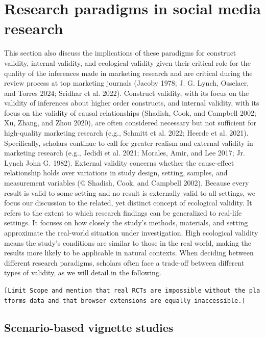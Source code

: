 \documentclass[
  a4paper,
]{scrreprt}
\begin{document}
\hypertarget{research-paradigms-in-social-media-research}{%
\section{Research paradigms in social media
research}\label{research-paradigms-in-social-media-research}}

This section also discuss the implications of these paradigms for
construct validity, internal validity, and ecological validity given
their critical role for the quality of the inferences made in marketing
research and are critical during the review process at top marketing
journals (Jacoby 1978; J. G. Lynch, Osselaer, and Torres 2024; Sridhar
et al. 2022). Construct validity, with its focus on the validity of
inferences about higher order constructs, and internal validity, with
its focus on the validity of causal relationships (Shadish, Cook, and
Campbell 2002; Xu, Zhang, and Zhou 2020), are often considered necessary
but not sufficient for high-quality marketing research (e.g., Schmitt et
al. 2022; Heerde et al. 2021). Specifically, scholars continue to call
for greater realism and external validity in marketing research (e.g.,
Jedidi et al. 2021; Morales, Amir, and Lee 2017; Jr. Lynch John G.
1982). External validity concerns whether the cause-effect relationship
holds over variations in study design, setting, samples, and measurement
variables (@ Shadish, Cook, and Campbell 2002). Because every result is
valid to some setting and no result is externally valid to all settings,
we focus our discussion to the related, yet distinct concept of
ecological validity. It refers to the extent to which research findings
can be generalized to real-life settings. It focuses on how closely the
study's methods, materials, and setting approximate the real-world
situation under investigation. High ecological validity means the
study's conditions are similar to those in the real world, making the
results more likely to be applicable in natural contexts. When deciding
between different research paradigms, scholars often face a trade-off
between different types of validity, as we will detail in the following.

\texttt{{[}Limit\ Scope\ and\ mention\ that\ real\ RCTs\ are\ impossible\ without\ the\ platforms\textquotesingle{}\ data\ and\ that\ browser\ extensions\ are\ equally\ inaccessible.{]}}

\hypertarget{scenario-based-vignette-studies}{%
\subsection{Scenario-based vignette
studies}\label{scenario-based-vignette-studies}}
\end{document}
